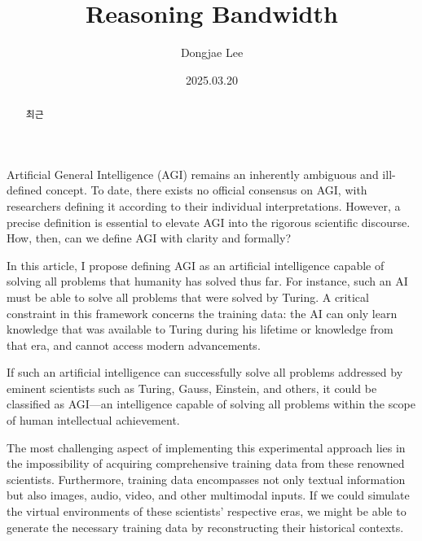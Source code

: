 \documentclass[11pt, oneside]{article}   	%
\title{Reasoning Bandwidth}
\author{Dongjae Lee}
\date{2025.03.20}
\begin{document}
\maketitle


\begin{abstract}
  최근 
\end{abstract}
  Artificial General Intelligence (AGI) remains an inherently ambiguous and ill-defined concept. To date, there exists no official consensus on AGI, with researchers defining it according to their individual interpretations. However, a precise definition is essential to elevate AGI into the rigorous scientific discourse. How, then, can we define AGI with clarity and formally?

  In this article, I propose defining AGI as an artificial intelligence capable of solving all problems that humanity has solved thus far. For instance, such an AI must be able to solve all problems that were solved by Turing. A critical constraint in this framework concerns the training data: the AI can only learn knowledge that was available to Turing during his lifetime or knowledge from that era, and cannot access modern advancements.

  If such an artificial intelligence can successfully solve all problems addressed by eminent scientists such as Turing, Gauss, Einstein, and others, it could be classified as AGI—an intelligence capable of solving all problems within the scope of human intellectual achievement.

  The most challenging aspect of implementing this experimental approach lies in the impossibility of acquiring comprehensive training data from these renowned scientists. Furthermore, training data encompasses not only textual information but also images, audio, video, and other multimodal inputs. If we could simulate the virtual environments of these scientists' respective eras, we might be able to generate the necessary training data by reconstructing their historical contexts.
\end{document}
